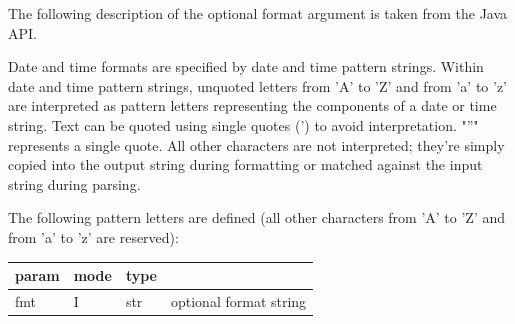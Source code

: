         The following description of the optional format argument is taken
        from the Java API.
        
        Date and time formats are specified by date and time pattern strings.
        Within date and time pattern strings, unquoted letters from 'A' to 'Z'
        and from 'a' to 'z' are interpreted as pattern letters representing the
        components of a date or time string. Text can be quoted using single
        quotes (') to avoid interpretation. "''" represents a single quote. All
        other characters are not interpreted; they're simply copied into the
        output string during formatting or matched against the input string
        during parsing.

        The following pattern letters are defined (all other characters from 'A'
        to 'Z' and from 'a' to 'z' are reserved):

        \begin{tabular}{| l | l | l | l |}
        \hline
        param  & mode & type & \\
        \hline \hline
        fmt & I & str & optional format string   \\ \hline
        \end{tabular}



